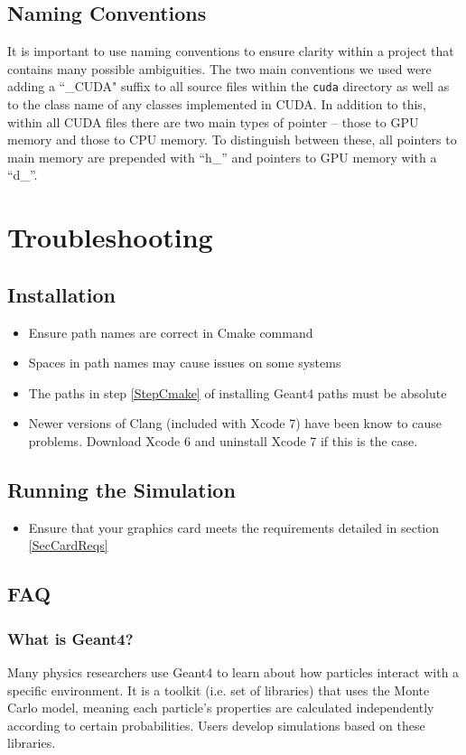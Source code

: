 \documentclass[12pt]{article}
\begin{document}
\subsection{Naming Conventions} %
It is important to use naming conventions to ensure clarity within a project that contains many possible ambiguities. The two main conventions we used were adding a ``\_CUDA" suffix to all source files within the \texttt{cuda} directory as well as to the class name of any classes implemented in CUDA. In addition to this, within all CUDA files there are two main types of pointer -- those to GPU memory and those to CPU memory. To distinguish between these, all pointers to main memory are prepended with ``h\_'' and pointers to GPU memory with a ``d\_''.

\section{Troubleshooting}\label{SecTroubleshooting} %
\subsection{Installation} %
\begin{itemize}
\item Ensure path names are correct in Cmake command
\item Spaces in path names may cause issues on some systems
\item The paths in step \ref{StepCmake} of installing Geant4 paths must be absolute
\item Newer versions of Clang (included with Xcode 7) have been know to cause problems. Download Xcode 6 and uninstall Xcode 7 if this is the case.
\end{itemize}

\subsection{Running the Simulation} %
\begin{itemize}
\item Ensure that your graphics card meets the requirements detailed in section \ref{SecCardReqs}
\end{itemize}

\subsection{FAQ} %
\subsubsection{What is Geant4?}
Many physics researchers use Geant4 to learn about how particles interact with a specific environment. It is a toolkit (i.e. set of libraries) that uses the Monte Carlo model, meaning each particle's properties are calculated independently according to certain probabilities. Users develop simulations based on these libraries.
\end{document}
